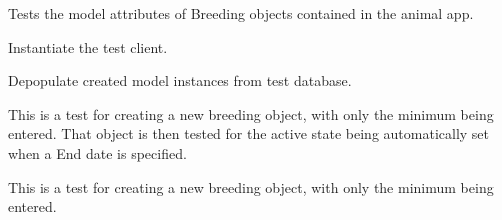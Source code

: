 \documentclass[letterpaper,10pt,english]{sphinxmanual}
\begin{document}
\begin{fulllineitems}
\label{animals:mousedb.animal.tests.BreedingModelTests}
Tests the model attributes of Breeding objects contained in the animal app.

\begin{fulllineitems}
\label{animals:mousedb.animal.tests.BreedingModelTests.setUp}
Instantiate the test client.

\end{fulllineitems}


\begin{fulllineitems}
\label{animals:mousedb.animal.tests.BreedingModelTests.tearDown}
Depopulate created model instances from test database.

\end{fulllineitems}


\begin{fulllineitems}
\label{animals:mousedb.animal.tests.BreedingModelTests.test_autoset_active_state}
This is a test for creating a new breeding object, with only the minimum being entered.  That object is then tested for the active state being automatically set when a End date is specified.

\end{fulllineitems}


\begin{fulllineitems}
\label{animals:mousedb.animal.tests.BreedingModelTests.test_create_breeding_minimal}
This is a test for creating a new breeding object, with only the minimum being entered.

\end{fulllineitems}



\end{fulllineitems}
\end{document}

